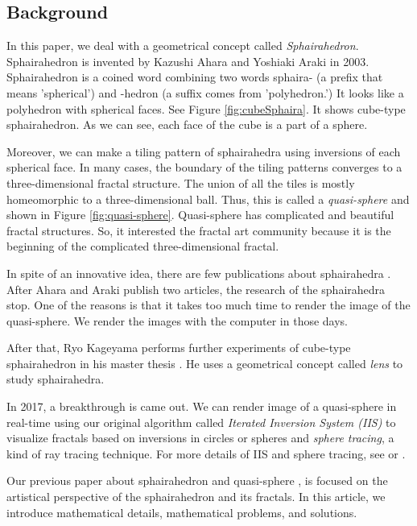 \documentclass[suppldata, dvipdfmx]{interact}
\theoremstyle{plain}%
\theoremstyle{definition}
\theoremstyle{remark}
\theoremstyle{problemstyle}
\begin{document}
\subsection{Background}

In this paper, we deal with a geometrical concept called
\textit{Sphairahedron}. Sphairahedron is invented by Kazushi Ahara and
Yoshiaki Araki \cite{AharaAraki} in 2003. Sphairahedron is a coined word
combining two words sphaira- (a prefix that means 'spherical') and
 -hedron (a suffix comes from 'polyhedron.') It looks like a polyhedron
with spherical faces. See Figure \ref{fig:cubeSphaira}. It shows cube-type
sphairahedron. As we can see, each face of the cube is a part of a
sphere.

Moreover, we can make a tiling pattern of sphairahedra using inversions
of each spherical face. In many cases, the boundary of the tiling
patterns converges to a three-dimensional fractal structure. 
The union of all the tiles is mostly homeomorphic to a three-dimensional
ball. Thus, this is called a \textit{quasi-sphere} and shown in Figure
\ref{fig:quasi-sphere}.
Quasi-sphere has complicated and beautiful fractal structures.
So, it interested the fractal art community because it is the beginning of
the complicated three-dimensional fractal.

In spite of an innovative idea, there are few publications about sphairahedra
\cite{AharaAraki}\cite{AharaJa}.
After Ahara and Araki publish two articles, the research of the
sphairahedra stop. 
One of the reasons is that it takes too much time to render the image of
the quasi-sphere.
We render the images with the computer in those days.

After that, Ryo Kageyama performs further experiments of
cube-type sphairahedron in his master thesis \cite{kageyama}. 
He uses a geometrical concept called \textit{lens} to study sphairahedra. 

In 2017, a breakthrough is came out. We can render image of a
quasi-sphere in real-time using our original algorithm called
\textit{Iterated Inversion System (IIS)} to visualize fractals based on
inversions in circles or spheres and \textit{sphere tracing}, a kind of
ray tracing technique.
For more details of IIS and sphere tracing, see \cite{bridges2016} or
\cite{bridges2017}.

Our previous paper about sphairahedron and quasi-sphere
\cite{bridges2018}, is focused on the artistical
perspective of the sphairahedron and its fractals.
In this article, we introduce mathematical details,
mathematical problems, and solutions. 
\end{document}

